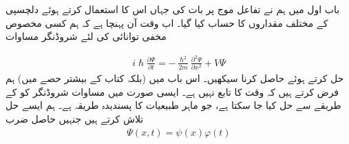 باب اول میں ہم نے تفاعل موج پر بات کی جہاں اس کا استعمال کرتے ہوئے دلچسپی کے مختلف مقداروں کا حساب کیا گیا۔ اب وقت آن پہنچا ہے کہ ہم کسی مخصوص مخفی توانائی  کی لئے شروڈنگر مساوات

\begin{align}\label{مساوات_شروڈنگر_تابع_وقت}
i \hslash \frac{\partial \Psi}{\partial t} = - \frac{\hslash^{2}}{2 m} \frac{\partial^{2} \Psi}{\partial x^{2}} + V\Psi
\end{align}
  حل کرتے ہوئے     حاصل کرنا سیکھیں۔  اس باب میں (بلکہ کتاب کے بیشتر حصے میں) ہم فرض کرتے ہیں  کہ   وقت  کا تابع نہیں ہے۔ ایسی صورت میں مساوات شروڈنگر کو  کے طریقے سے حل کیا جا سکتا ہے، جو ماہر طبیعیات کا پسندیدہ طریقہ ہے۔ ہم ایسے حل تلاش کرتے ہیں جنہیں حاصل ضرب
\begin{align}
\Psi (x,t) = \psi (x)  \varphi (t)
\end{align}

